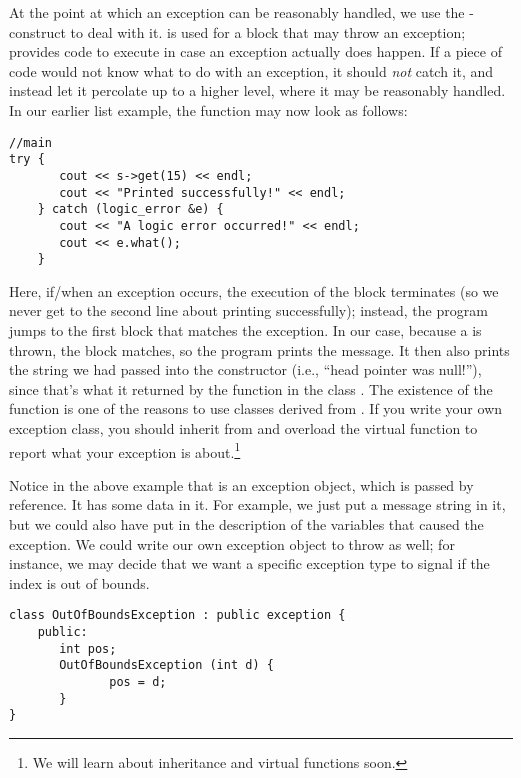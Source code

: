 At the point at which an exception can be reasonably handled, we use
the - construct to deal with it.
 is used for a block that may throw an exception;
 provides code to execute in case an exception actually
does happen. If a piece of code would not know what to do with an
exception, it should \emph{not} catch it, and instead let it percolate
up to a higher level, where it may be reasonably handled.
In our earlier list example, the  function may now look as
follows:

\begin{verbatim}
//main
try {
       cout << s->get(15) << endl;
       cout << "Printed successfully!" << endl;
    } catch (logic_error &e) {
       cout << "A logic error occurred!" << endl;
       cout << e.what();
    }
\end{verbatim}

Here, if/when an exception occurs, the execution of the 
block terminates (so we never get to the second line about printing
successfully); instead, the program jumps to the first 
block that matches the exception. In our case, because a
 is thrown, the  block matches, so the
program prints the message. It then also prints the string we had
passed into the constructor (i.e., ``head pointer was null!''), since
that's what it returned by the  function in the class
. The existence of the  function is one
of the reasons to use classes derived from .
If you write your own exception class, you should inherit from
 and overload the virtual  function to
report what your exception is about.\footnote{We will learn about
  inheritance and virtual functions soon.}

Notice in the above example that  is an exception object,
which is passed by reference. It has some data in it. 
For example, we just put a message string in it, but we could also
have put in the description of the variables that caused the
exception. 
We could write our own exception object to throw as well; 
for instance, we may decide that we want a specific
exception type to signal if the index is out of bounds.

\begin{verbatim}
class OutOfBoundsException : public exception {
    public:
       int pos;
       OutOfBoundsException (int d) {
              pos = d;
       }   
}
\end{verbatim}

